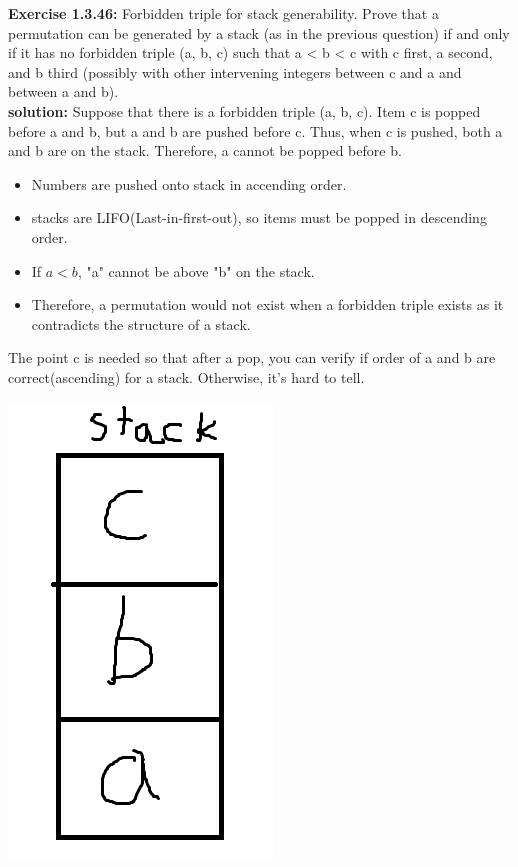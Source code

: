 \documentclass[11pt,fleqn]{article}
\begin{document}
\textbf{Exercise 1.3.46:} Forbidden triple for stack generability. Prove that a permutation can be generated
by a stack (as in the previous question) if and only if it has no forbidden triple (a, b,
c) such that a < b < c with c first, a second, and b third (possibly with other intervening
integers between c and a and between a and b).\\

\textbf{solution:} Suppose that there is a forbidden triple (a, b, c). Item c is popped before
a and b, but a and b are pushed before c. Thus, when c is pushed, both a and b are on
the stack. Therefore, a cannot be popped before b.\\

\begin{itemize}
	\item Numbers are pushed onto stack in accending order.
	\item stacks are LIFO(Last-in-first-out), so items must be popped in descending order.
	\item If $a<b$, "a" cannot be above "b" on the stack.
	\item Therefore, a permutation would not exist when a forbidden triple exists as it contradicts the structure of a stack.
\end{itemize}

The point c is needed so that after a pop, you can verify if order of a and b are correct(ascending) for a stack. Otherwise, it's hard to tell.


\begin{center}
	\includegraphics[scale = 1]{1.3.46.png}
	\end{center}
\end{document}

